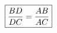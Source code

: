 \documentclass[preview]{standalone}
\begin{document}
\begin{align*}
\special{dvisvgm:raw <g id='unique000'>}\boxed{\frac{BD}{DC}=\frac{AB}{AC}}\special{dvisvgm:raw </g>}
\end{align*}
\end{document}
